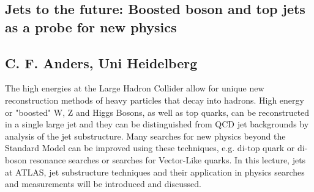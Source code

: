 \subsection*{Jets to the future: Boosted boson and top jets as a probe for new
  physics}
\subsection*{C. F. Anders, Uni Heidelberg}
\noindent The high energies at the Large Hadron Collider allow for unique new reconstruction methods of heavy particles that decay into hadrons. High energy or "boosted" W, Z and Higgs Bosons, as well as top quarks, can be reconstructed in a single large jet and they can be distinguished from QCD jet backgrounds by analysis of the jet substructure. 
Many searches for new physics beyond the Standard Model can be improved using these techniques, e.g. di-top quark or di-boson resonance searches or searches for Vector-Like quarks.\newline
In this lecture, jets at ATLAS, jet substructure techniques and their application in physics searches and measurements will be introduced and discussed.
